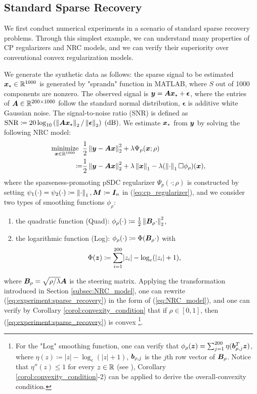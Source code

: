 \documentclass[lettersize,journal]{IEEEtran}
\theoremstyle{plain}%
\theoremstyle{definition}
\theoremstyle{remark}
\begin{document}
\subsection{Standard Sparse Recovery}\label{sec:experiments:sparse_recovery}
We first conduct numerical experiments in a scenario of standard sparse recovery problems. Through this simplest example, we can understand many properties of CP regularizers and NRC models, and we can verify their superiority over conventional convex regularization models.


We generate the synthetic data as follows: the sparse signal to be estimated $\bm{x}_{\star}\in\mathbb{R}^{1000}$ is generated by "sprandn" function in MATLAB, where $S$ out of 1000 components are nonzero. The observed signal is $\bm{y}=\bm{A}\bm{x}_\star+\bm{\epsilon}$, where the entries of $\bm{A}\in\mathbb{R}^{200\times 1000}$ follow the standard normal distribution, $\bm{\epsilon}$ is additive white Gaussian noise. The signal-to-noise ratio (SNR) is defined as $\textrm{SNR}\coloneqq 20\log_{10}\left( \left\| \bm{A}\bm{x}_\star \right\|_2/\left\| \bm{\epsilon} \right\|_2 \right ) \;(\textrm{dB})$. We estimate $\bm{x}_\star$ from $\bm{y}$ by solving the following NRC model:
\begin{align}\label{eq:experiment:sparse_recovery}
\underset{\bm{x}\in\mathbb{R}^{1000}}{\mathrm{minimize}}\;\;  &\frac{1}{2}\left\| \bm{y}-\bm{A}\bm{x} \right\|^2_2+\lambda\Psi_{p}(\bm{x};\rho)\nonumber\\
\coloneqq &  \frac{1}{2}\left\| \bm{y}-\bm{A}\bm{x} \right\|^2_2+\lambda\left\| \bm{x} \right\|_1-\lambda(\left\| \cdot \right\|_1\Box\phi_\rho)(\bm{x}),
\end{align}
where the sparseness-promoting pSDC regularizer $\Psi_{p}(\cdot;\rho)$ is constructed by setting $\psi_1(\cdot)=\psi_2(\cdot)\coloneqq \left\| \cdot \right\|_1, \bm{M}\coloneqq\bm{I}_n$ in (\ref{eq:cp_regularizer}), and we consider two types of smoothing functions $\phi_{\rho}$:
\begin{enumerate}
\item the quadratic function (Quad): $\phi_{\rho}(\cdot)\coloneqq \frac{1}{2}\left\| \bm{B}_\rho\cdot \right\|^2_2$,

\item the logarithmic function (Log): $\phi_{\rho}(\cdot)\coloneqq \Phi(\bm{B}_\rho\cdot)$ with 
\[\Phi(\bm{z})\coloneqq \sum_{i=1}^{200} \lvert z_i \rvert-\log_e(\lvert z_i \rvert +1),\]
\end{enumerate}
where $\bm{B}_\rho=\sqrt{\rho/\lambda}\bm{A}$ is the steering matrix. Applying the transformation introduced in Section \ref{subsec:NRC_model}, one can rewrite (\ref{eq:experiment:sparse_recovery}) in the form of (\ref{eq:NRC_model}), and one can verify by Corollary \ref{corol:convexity_condition} that if $\rho\in[0,1]$, then (\ref{eq:experiment:sparse_recovery}) is convex \footnote{For the "Log" smoothing function, one can verify that $\phi_{\rho}(\bm{z})=\sum_{j=1}^{200} \eta(\bm{b}_{\rho,j}^T\bm{z})$, where $\eta(z)\coloneqq |z|-\log_e(|z|+1)$, $\bm{b}_{\rho,j}$ is the $j$th row vector of $\bm{B}_{\rho}$. Notice that $\eta''(z)\leq 1$ for every $z\in\mathbb{R}$ (see \cite[Table III]{lange1990}), Corollary \ref{corol:convexity_condition}-2) can be applied to derive the overall-convexity condition.}. 
\end{document}
